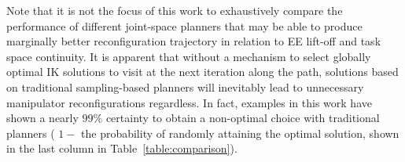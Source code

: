 \documentclass[letterpaper, 10 pt, conference]{ieeeconf}  %
\begin{document}
Note that it is not the focus of this work to exhaustively compare the performance of different joint-space planners that may be able to produce marginally better reconfiguration trajectory in relation to EE lift-off and task space continuity. It is apparent that without a mechanism to select globally optimal IK solutions to visit at the next iteration along the path, solutions based on traditional sampling-based planners will inevitably lead to unnecessary manipulator reconfigurations regardless. In fact, examples in this work have shown a nearly $99\%$ certainty to obtain a non-optimal choice with traditional planners ( $1 - $ the probability of randomly attaining the optimal solution, shown in the last column in Table~\ref{table:comparison}).
\end{document}
